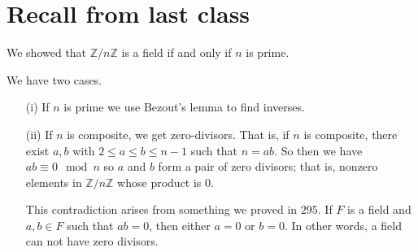 
\section{Recall from last class}
\begin{eg}
	We showed that \(\mathbb{Z} /n\mathbb{Z} \) is a field if and only if \(n\) is prime.
\end{eg}
\begin{explanation}
	We have two cases.
	\begin{itemize}
		\item[(i)] If \(n\) is prime we use Bezout's lemma to find inverses.
		\item[(ii)] If \(n\) is composite, we get zero-divisors. That is, if \(n\) is composite, there exist \(a,b\) with \(2\leq a\leq b\leq n-1\) such that \(n=ab\). So then we have \(ab \equiv 0 \mod n\) so \(a\) and \(b\) form a pair of zero divisors; that is, nonzero elements in \(\mathbb{Z} /n\mathbb{Z} \) whose product is \(0\).
		      \begin{note}
			      This contradiction arises from something we proved in \(295\). If \(F\) is a field and \(a,b \in F\) such that \(ab=0\), then either \(a=0\) or \(b=0\). In other words, a field can not have zero divisors.
		      \end{note}
	\end{itemize}
\end{explanation}

